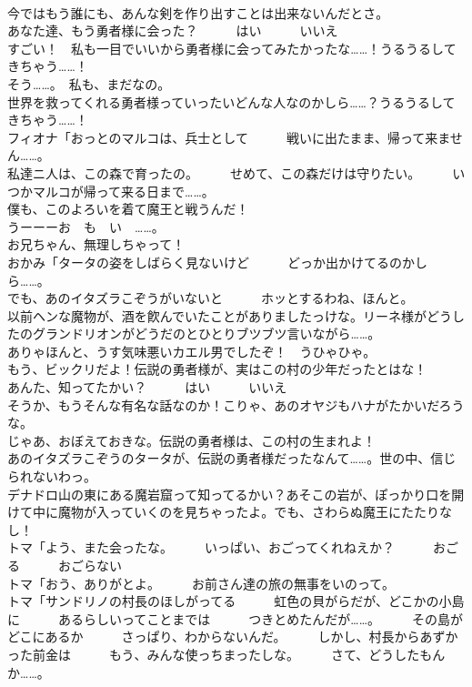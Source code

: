 \documentclass[8pt]{extreport}
\begin{document}
\begin{CJK}{UTF8}{min}
\\	今ではもう誰にも、あんな剣を作り出すことは出来ないんだとさ。	
\\	あなた達、もう勇者様に会った？　　　はい　　　いいえ	
\\	すごい！　私も一目でいいから勇者様に会ってみたかったな……！うるうるしてきちゃう……！	
\\	そう……。　私も、まだなの。	
\\	世界を救ってくれる勇者様っていったいどんな人なのかしら……？うるうるしてきちゃう……！	
\\	フィオナ「おっとのマルコは、兵士として　　　戦いに出たまま、帰って来ません……。	
\\	私達ニ人は、この森で育ったの。　　　せめて、この森だけは守りたい。　　　いつかマルコが帰って来る日まで……。	
\\	僕も、このよろいを着て魔王と戦うんだ！	
\\	うーーーお　も　い　……。	
\\	お兄ちゃん、無理しちゃって！	
\\	おかみ「タータの姿をしばらく見ないけど　　　どっか出かけてるのかしら……。	
\\	でも、あのイタズラこぞうがいないと　　　ホッとするわね、ほんと。	
\\	以前ヘンな魔物が、酒を飮んでいたことがありましたっけな。リーネ様がどうしたのグランドリオンがどうだのとひとりブツブツ言いながら……。	
\\	ありゃほんと、うす気味悪いカエル男でしたぞ！　うひゃひゃ。	
\\	もう、ビックリだよ！伝説の勇者様が、実はこの村の少年だったとはな！	
\\	あんた、知ってたかい？　　　はい　　　いいえ	
\\	そうか、もうそんな有名な話なのか！こりゃ、あのオヤジもハナがたかいだろうな。	
\\	じゃあ、おぼえておきな。伝説の勇者様は、この村の生まれよ！	
\\	あのイタズラこぞうのタータが、伝説の勇者様だったなんて……。世の中、信じられないわっ。	
\\	デナドロ山の東にある魔岩窟って知ってるかい？あそこの岩が、ぽっかり口を開けて中に魔物が入っていくのを見ちゃったよ。でも、さわらぬ魔王にたたりなし！	
\\	トマ「よう、また会ったな。　　　いっぱい、おごってくれねえか？　　　おごる　　　おごらない	
\\	トマ「おう、ありがとよ。　　　お前さん達の旅の無事をいのって。	
\\	トマ「サンドリノの村長のほしがってる　　　虹色の貝がらだが、どこかの小島に　　　あるらしいってことまでは　　　つきとめたんだが……。　　　その島がどこにあるか　　　さっぱり、わからないんだ。　　　しかし、村長からあずかった前金は　　　もう、みんな使っちまったしな。　　　さて、どうしたもんか……。	

\end{CJK}
\end{document}
